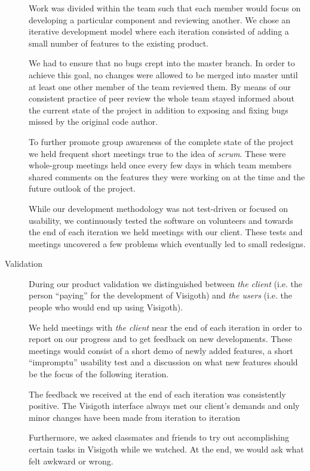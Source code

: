 \documentclass[a4paper,11pt]{article}
\begin{document}
\begin{description}
  Work was divided within the team such that each member would focus
  on developing a particular component and reviewing another. We chose
  an iterative development model where each iteration consisted of
  adding a small number of features to the existing product.

  We had to ensure that no bugs crept into the master branch. In order
  to achieve this goal, no changes were allowed to be merged into
  master until at least one other member of the team reviewed them.
  By means of our consistent practice of peer review the whole team
  stayed informed about the current state of the project in addition
  to exposing and fixing bugs missed by the original code author.

  To further promote group awareness of the complete state of the
  project we held frequent short meetings true to the idea of
  \emph{scrum}. These were whole-group meetings held once every few
  days in which team members shared comments on the features they
  were working on at the time and the future outlook of the project.

  While our development methodology was not test-driven or focused on
  usability, we continuously tested the software on volunteers and
  towards the end of each iteration we held meetings with our client.
  These tests and meetings uncovered a few problems which eventually
  led to small redesigns.

\item[Validation]

  During our product validation we distinguished between \emph{the
    client} (i.e.  the person ``paying'' for the development of
  Visigoth) and \emph{the users} (i.e. the people who would end up
  using Visigoth).

  We held meetings with \emph{the client} near the end of each
  iteration in order to report on our progress and to get feedback on
  new developments. These meetings would consist of a short demo of
  newly added features, a short ``impromptu'' usability test and a
  discussion on what new features should be the focus of the following
  iteration.

  The feedback we received at the end of each iteration was
  consistently positive. The Visigoth interface always met our
  client's demands and only minor changes have been made from
  iteration to iteration

  Furthermore, we asked classmates and friends to try out
  accomplishing certain tasks in Visigoth while we watched. At the
  end, we would ask what felt awkward or wrong.


\end{description}
\end{document}
